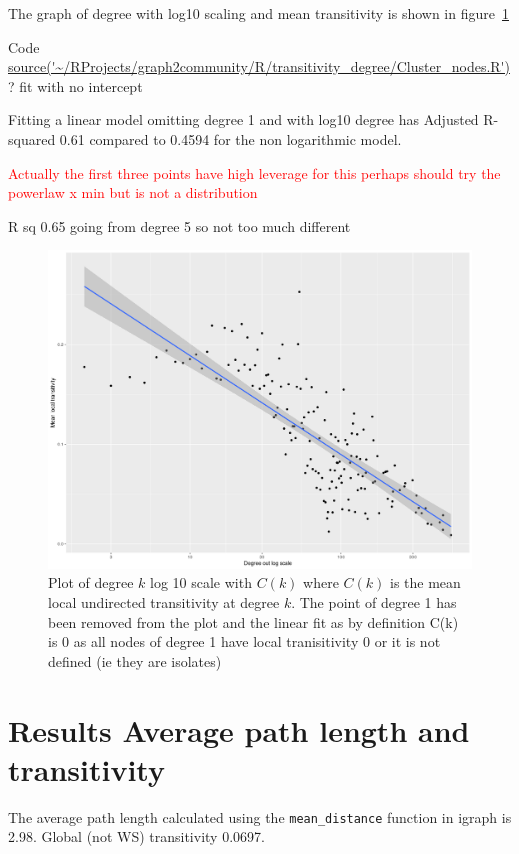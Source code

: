 The graph of degree with log10 scaling and mean transitivity is shown in figure~\ref{fig:C(k)_remove0}

Code \url{source('~/RProjects/graph2community/R/transitivity_degree/Cluster_nodes.R')}
? fit with no intercept

Fitting a linear model omitting degree 1 and with log10 degree has Adjusted R-squared 0.61 compared to 0.4594 for the non logarithmic model.

\textcolor{red}{Actually the first three points have high leverage for this perhaps should try the powerlaw x min but is not a distribution}

R sq 0.65 going from degree 5 so not too much different

\begin{figure}
    \centering
    \includegraphics[width=\textwidth]{images/Rplot_k(c)_remove0.png}
    \caption{Plot of degree $k$ log 10 scale with $C(k)$ where $C(k)$ is the mean local undirected transitivity at degree $k$. The point of degree 1 has been removed from the plot and the linear fit as by definition C(k) is 0 as all nodes of degree 1 have local tranisitivity 0 or it is not defined (ie they are isolates)}
    \label{fig:C(k)_remove0}
\end{figure}
\section{ Results Average path length and transitivity}
\label{sec:Results average path length and transitivity}
The average path length calculated using the \texttt{mean\_distance} function in igraph is 2.98. Global (not WS) transitivity 0.0697.

